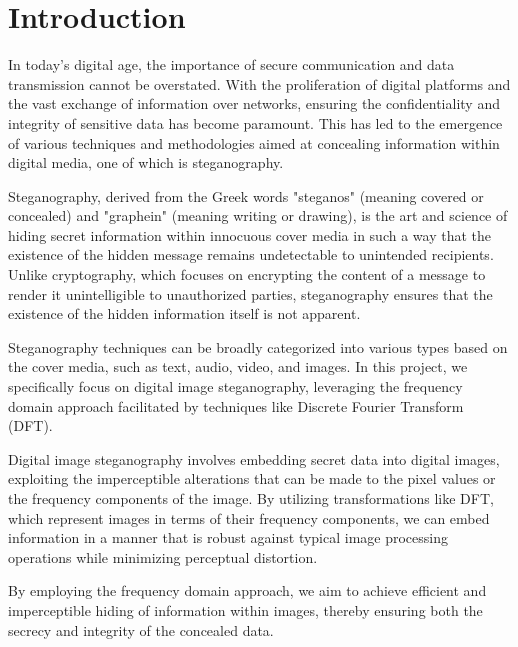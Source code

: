 \section{Introduction}
\label{sec:intro}
In today's digital age, the importance of secure communication and data transmission cannot be overstated. With the proliferation of digital platforms and the vast exchange of information over networks, ensuring the confidentiality and integrity of sensitive data has become paramount. This has led to the emergence of various techniques and methodologies aimed at concealing information within digital media, one of which is steganography.

Steganography, derived from the Greek words "steganos" (meaning covered or concealed) and "graphein" (meaning writing or drawing), is the art and science of hiding secret information within innocuous cover media in such a way that the existence of the hidden message remains undetectable to unintended recipients. Unlike cryptography, which focuses on encrypting the content of a message to render it unintelligible to unauthorized parties, steganography ensures that the existence of the hidden information itself is not apparent.

Steganography techniques can be broadly categorized into various types based on the cover media, such as text, audio, video, and images. In this project, we specifically focus on digital image steganography, leveraging the frequency domain approach facilitated by techniques like Discrete Fourier Transform (DFT).

Digital image steganography involves embedding secret data into digital images, exploiting the imperceptible alterations that can be made to the pixel values or the frequency components of the image. By utilizing transformations like DFT, which represent images in terms of their frequency components, we can embed information in a manner that is robust against typical image processing operations while minimizing perceptual distortion.

By employing the frequency domain approach, we aim to achieve efficient and imperceptible hiding of information within images, thereby ensuring both the secrecy and integrity of the concealed data.

